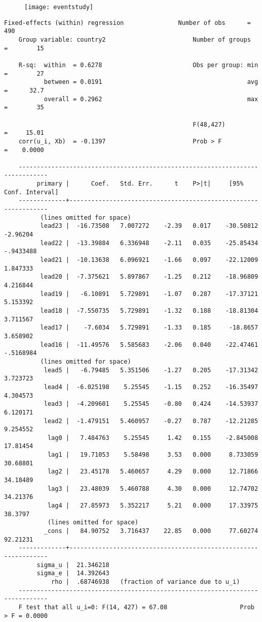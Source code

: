 \documentclass[12pt]{article}
\begin{document}
\begin{figure}[h!]
\begin{center}
\texttt{[image: eventstudy]} 
\end{center}
\end{figure}

\bigskip
\scriptsize
\begin{Verbatim}[tabsize=10]
	Fixed-effects (within) regression               Number of obs      =       490
	Group variable: country2                        Number of groups   =        15
	
	R-sq:  within  = 0.6278                         Obs per group: min =        27
	       between = 0.0191                                        avg =      32.7
	       overall = 0.2962                                        max =        35
	
	                                                F(48,427)          =     15.01
	corr(u_i, Xb)  = -0.1397                        Prob > F           =    0.0000
	
	------------------------------------------------------------------------------
	     primary |      Coef.   Std. Err.      t    P>|t|     [95% Conf. Interval]
	-------------+----------------------------------------------------------------
	      (lines omitted for space)
	      lead23 |  -16.73508   7.007272    -2.39   0.017    -30.50812    -2.96204
	      lead22 |  -13.39884   6.336948    -2.11   0.035    -25.85434   -.9433488
	      lead21 |  -10.13638   6.096921    -1.66   0.097    -22.12009    1.847333
	      lead20 |  -7.375621   5.897867    -1.25   0.212    -18.96809    4.216844
	      lead19 |   -6.10891   5.729891    -1.07   0.287    -17.37121    5.153392
	      lead18 |  -7.550735   5.729891    -1.32   0.188    -18.81304    3.711567
	      lead17 |    -7.6034   5.729891    -1.33   0.185     -18.8657    3.658902
	      lead16 |  -11.49576   5.585683    -2.06   0.040    -22.47461   -.5168984
	      (lines omitted for space)
	       lead5 |   -6.79485   5.351506    -1.27   0.205    -17.31342    3.723723
	       lead4 |  -6.025198    5.25545    -1.15   0.252    -16.35497    4.304573
	       lead3 |  -4.209601    5.25545    -0.80   0.424    -14.53937    6.120171
	       lead2 |  -1.479151   5.460957    -0.27   0.787    -12.21285    9.254552
	        lag0 |   7.484763    5.25545     1.42   0.155    -2.845008    17.81454
	        lag1 |   19.71053    5.58498     3.53   0.000     8.733059    30.68801
	        lag2 |   23.45178   5.460657     4.29   0.000     12.71866    34.18489
	        lag3 |   23.48039   5.460788     4.30   0.000     12.74702    34.21376
	        lag4 |   27.85973   5.352217     5.21   0.000     17.33975     38.3797
	        (lines omitted for space)
	       _cons |   84.90752   3.716437    22.85   0.000     77.60274    92.21231
	-------------+----------------------------------------------------------------
	     sigma_u |  21.346218
	     sigma_e |  14.392643
	         rho |  .68746938   (fraction of variance due to u_i)
	------------------------------------------------------------------------------
	F test that all u_i=0: F(14, 427) = 67.08                    Prob > F = 0.0000
\end{Verbatim}
\normalsize
\bigskip
\end{document}

